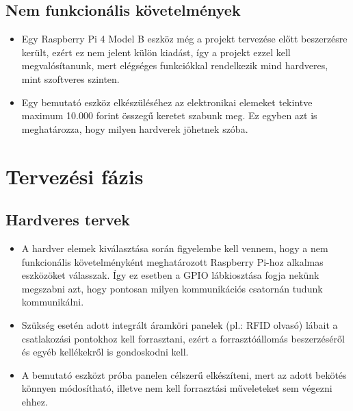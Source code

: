 \documentclass[11pt, a4paper]{article}
\begin{document}
		\subsection{Nem funkcionális követelmények}
			\begin{itemize}
				\justifying
				\item Egy Raspberry Pi 4 Model B eszköz még a projekt tervezése előtt beszerzésre került, ezért ez nem jelent külön kiadást, így a projekt ezzel kell megvalósítanunk, mert elégséges funkciókkal rendelkezik mind hardveres, mint szoftveres szinten.
				
				\item Egy bemutató eszköz elkészüléséhez az elektronikai elemeket tekintve maximum 10.000 forint összegű keretet szabunk meg. Ez egyben azt is meghatározza, hogy milyen hardverek jöhetnek szóba.
			\end{itemize}
		\vfill
	\section{Tervezési fázis}
		\subsection{Hardveres tervek}
			\begin{itemize}
				\justifying
				
				\item A hardver elemek kiválasztása során figyelembe kell vennem, hogy a nem funkcionális követelményként meghatározott Raspberry Pi-hoz alkalmas eszközöket válasszak. Így ez esetben a GPIO lábkiosztása fogja nekünk megszabni azt, hogy pontosan milyen kommunikációs csatornán tudunk kommunikálni. 
				
				\item Szükség esetén adott integrált áramköri panelek (pl.: RFID olvasó) lábait a csatlakozási pontokhoz kell forrasztani, ezért a forrasztóállomás beszerzéséről és egyéb kellékekről is gondoskodni kell.
				
				\item A bemutató eszközt próba panelen célszerű elkészíteni, mert az adott bekötés könnyen módosítható, illetve nem kell forrasztási műveleteket sem végezni ehhez.
			\end{itemize}
		\vfill
\end{document}
